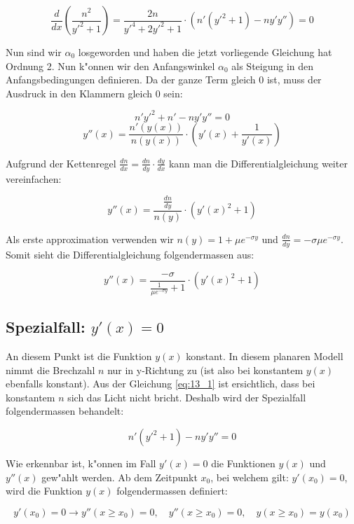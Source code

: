 $$\frac{d}{dx} \left( \frac{n^2}{y'^2 + 1} \right) = \frac{2n}{y'^4 +
2y'^2 + 1} \cdot \left( n'(y'^2 + 1) - n y' y'' \right) = 0$$

Nun sind wir $\alpha_0$ losgeworden und haben die jetzt vorliegende Gleichung hat Ordnung
2. Nun k"onnen wir den Anfangswinkel $\alpha_0$ als Steigung in den Anfangsbedingungen
definieren. Da der ganze Term gleich 0 ist, muss der Ausdruck in den Klammern gleich 0
sein:

$$n'y'^2 + n' - n y' y'' = 0$$
$$y''(x) = \frac{n'(y(x))}{n(y(x))} \cdot \left( y'(x) + \frac{1}{y'(x)} \right)$$

Aufgrund der Kettenregel $\frac{dn}{dx} = \frac{dn}{dy} \cdot \frac{dy}{dx}$ kann man die
Differentialgleichung weiter vereinfachen:

\begin{equation} \label{eq:planar_DGL}
y''(x) = \frac{\frac{dn}{dy}}{n(y)} \cdot \left( y'(x)^2 + 1\right)
\end{equation}

Als erste approximation verwenden wir $n(y) = 1 + \mu e^{-\sigma y}$ und $\frac{dn}{dy} =
-\sigma \mu e^{-\sigma y}$.
Somit sieht die Differentialgleichung folgendermassen aus:

\begin{equation} \label{eq:planar_DGL_n}
y''(x) = \frac{-\sigma}{\frac{1}{\mu e^{-\sigma y}} + 1} \cdot \left(
y'(x)^2 + 1 \right)
\end{equation}

\subsection{Spezialfall: $y'(x) = 0$} \label{ch:spezialfall}

An diesem Punkt ist die Funktion $y(x)$ konstant. In diesem planaren Modell nimmt die
Brechzahl $n$ nur in y-Richtung zu (ist also bei konstantem $y(x)$ ebenfalls konstant).
Aus der Gleichung \ref{eq:13_1} ist ersichtlich, dass bei konstantem $n$ sich das Licht
nicht bricht. Deshalb wird der Spezialfall folgendermassen behandelt:

$$n' (y'^2 + 1) - n y' y'' = 0$$

Wie erkennbar ist, k"onnen im Fall $y'(x) = 0$ die Funktionen $y(x)$ und $y''(x)$ gew"ahlt
werden. Ab dem Zeitpunkt $x_0$, bei welchem gilt: $y'(x_0) = 0$, wird die Funktion $y(x)$
folgendermassen definiert:

$$y'(x_0) = 0 \longrightarrow y''(x \geq x_0) = 0, \quad y''(x \geq x_0) = 0, \quad 
y(x \geq x_0) = y(x_0)$$


